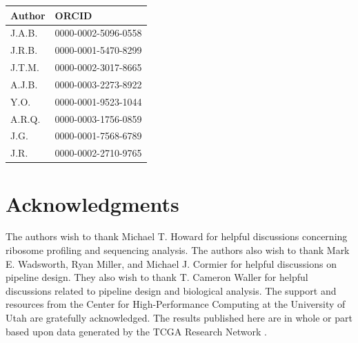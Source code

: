 \documentclass[10pt, oneside]{article}
\newcommand{\beginsupplement}{%
  \setcounter{table}{0}
  \renewcommand{\thetable}{S\arabic{table}}%
  \setcounter{figure}{0}
  \renewcommand{\thefigure}{S\arabic{figure}}%
}
\begin{document}
\begin{multicols}{2}
\begin{table}[!]
    \centering
{}
\begin{tabular}{p{1.5cm}p{4cm}}
 \textbf{Author} & \textbf{ORCID}\\
 \hline
 J.A.B. & 0000-0002-5096-0558 \\
 \hline
 J.R.B. & 0000-0001-5470-8299 \\
 \hline
 J.T.M. & 0000-0002-3017-8665 \\
 \hline
 A.J.B. & 0000-0003-2273-8922 \\
 \hline
 Y.O. & 0000-0001-9523-1044 \\
 \hline
 A.R.Q. & 0000-0003-1756-0859 \\
 \hline
 J.G. & 0000-0001-7568-6789 \\
 \hline
 J.R. & 0000-0002-2710-9765 \\
\end{tabular}
\end{table}

\section*{Acknowledgments}
The authors wish to thank Michael T. Howard for helpful discussions concerning ribosome profiling and sequencing analysis. The authors also wish to thank Mark E. Wadsworth, Ryan Miller, and Michael J. Cormier for helpful discussions on pipeline design. They also wish to thank T. Cameron Waller for helpful discussions related to pipeline design and biological analysis. The support and resources from the Center for High-Performance Computing at the University of Utah are gratefully acknowledged. The results published here are in whole or part based upon data generated by the TCGA Research Network \cite{tcga}.




\end{multicols}

\newpage
\beginsupplement
\end{document}
